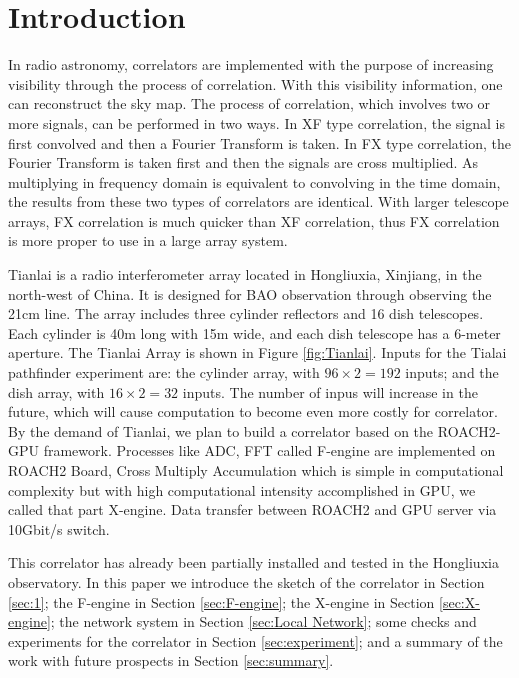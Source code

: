 \documentclass{ws-jai}
\begin{document}
\section{Introduction}

	In radio astronomy, correlators are implemented with the purpose of increasing visibility through the process of correlation. With this visibility information, one can reconstruct the sky map\cite{1986isra.book.....T}. The process of correlation, which involves two or more signals, can be performed in two ways. In XF type correlation, the signal is first convolved and then a Fourier Transform is taken. In FX type correlation, the Fourier Transform is taken first and then the signals are cross multiplied. As multiplying in frequency domain is equivalent to convolving in the time domain, the results from these two types of correlators are identical. With larger telescope arrays, FX correlation is much quicker than XF correlation\cite{2016JAI.....502002P}, thus FX correlation is more proper to use in a large array system.
	 
	Tianlai is a radio interferometer array located in Hongliuxia, Xinjiang, in the north-west of China\cite{2012IJMPS..12..256C}. It is designed for BAO observation through observing the 21cm line. The array includes three cylinder reflectors and 16 dish telescopes. Each cylinder is 40m long with 15m wide, and each dish telescope has a 6-meter aperture. The Tianlai Array is shown in Figure \ref{fig:Tianlai}. Inputs for the Tialai pathfinder experiment are: the cylinder array, with $96\times2=192$ inputs; and the dish array, with $16\times2=32$ inputs. The number of inpus will increase in the future, which will cause computation to become even more costly for correlator. By the demand of Tianlai, we plan to build a correlator based on the ROACH2-GPU framework. Processes like ADC, FFT called F-engine are implemented on ROACH2 Board, Cross Multiply Accumulation  which is simple in computational complexity but with high computational intensity accomplished in GPU, we called that part X-engine. Data transfer between ROACH2 and GPU server via 10Gbit/s switch.

	This correlator has already been partially installed and tested in the Hongliuxia observatory. In this paper we introduce the sketch of the correlator in Section \ref{sec:1}; the F-engine in Section \ref{sec:F-engine}; the X-engine in Section \ref{sec:X-engine}; the network system in Section \ref{sec:Local Network}; some checks and experiments for the correlator in Section \ref{sec:experiment}; and a summary of the work with future prospects in Section \ref{sec:summary}.
\end{document}
